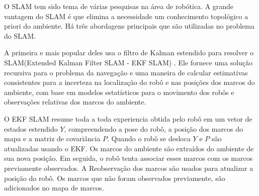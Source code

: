  O SLAM tem sido tema de várias pesquisas na área de robótica. A grande vantagem do SLAM é que elimina a necessidade 
um conhecimento topológico a priori do ambiente. Há três abordagens principais que são utilizadas no problema do SLAM. 

A primeira e mais popular deles usa o filtro de Kalman estendido para resolver o SLAM(Extended Kalman Filter SLAM - EKF SLAM) \cite{slam2}. Ele
fornece uma solução recursiva para o problema da navegação e uma maneira de calcular
estimativas consistentes para a incerteza na localização do robô e nas posições dos marcos do
ambiente, com base em modelos estatísticos para o movimento dos robôs e observações
relativas dos marcos do ambiente\cite{slam}.

O EKF SLAM resume toda a toda experiencia obtida pelo robô em um vetor de estados estendido $Y$, compreendendo a pose do 
robô, a posição dos marcos do mapa e a matriz de covariância $P$\cite{slam2}. Quando o robô se desloca $Y$ e $P$ são atualizadas
usando o EKF. Os marcos do ambiente são extraídos do ambiente de sua nova posição. Em seguida, o robô tenta associar esses
marcos com os marcos previamente observados. A Reobservação dos marcos são usados para atualizar a posição do robô. 
Os marcos que não foram observados previamente, são adicionados no mapa de marcos.

